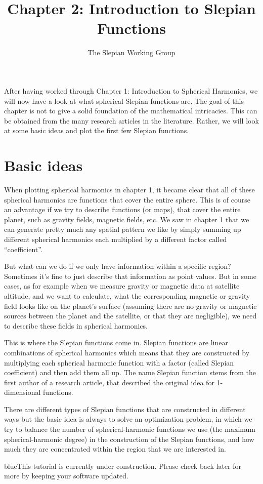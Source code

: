 \documentclass[11pt]{article}
\title{Chapter 2: Introduction to Slepian Functions}
\author{The Slepian Working Group}
\newcommand{\TAG}{\begin{color}{blue}This tutorial is currently under construction. Please check back later for more by keeping your software updated.\end{color}}
\begin{document}
\maketitle

After having worked through Chapter 1: Introduction to Spherical
Harmonics, we will now have a look at what spherical Slepian functions
are. The goal of this chapter is not to give a solid foundation of the
mathematical intricacies. This can be obtained from the many research
articles in the literature. Rather, we will look at some basic ideas
and plot the first few Slepian functions.


\section{Basic ideas}
When plotting spherical harmonics in chapter 1, it became clear that
all of these spherical harmonics are functions that cover the entire
sphere. This is of course an advantage if we try to describe functions
(or maps), that cover the entire planet, such as gravity fields,
magnetic fields, etc. We saw in chapter 1 that we can generate pretty
much any spatial pattern we like by simply summing up different
spherical harmonics each multiplied by a different factor called
``coefficient''.

But what can we do if we only have information within a specific
region? Sometimes it's fine to just describe that information as
point values. But in some cases, as for example when we measure
gravity or magnetic data at satellite altitude, and we want to
calculate, what the corresponding magnetic or gravity field looks like
on the planet's surface (assuming there are no gravity or magnetic
sources between the planet and the satellite, or that they are
negligible), we need to describe these fields in spherical harmonics.

This is where the Slepian functions come in. Slepian functions are
linear combinations of spherical harmonics which means that they are
constructed by multiplying each spherical harmonic function with a
factor (called Slepian coefficient) and then add them all up. The name
Slepian function stems from the first author of a research article,
that described the original idea for 1-dimensional functions.

There are different types of Slepian functions that are constructed in
different ways but the basic idea is always to solve an optimization
problem, in which we try to balance the number of spherical-harmonic
functions we use (the maximum spherical-harmonic degree) in the
construction of the Slepian functions, and how much they are
concentrated within the region that we are interested in.



\TAG
\end{document}

